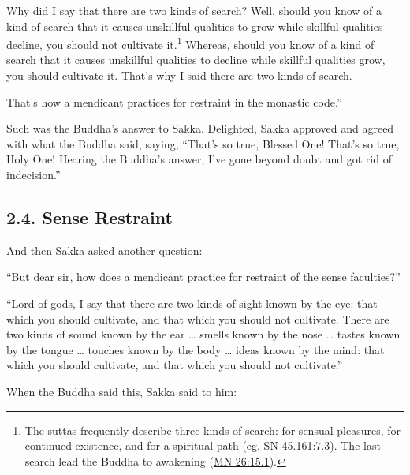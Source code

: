 \documentclass[12pt,openany]{book}%
\begin{document}
Why did I say that there are two kinds of search? Well, should you know of a kind of search that it causes unskillful qualities to grow while skillful qualities decline, you should not cultivate it.\footnote{The suttas frequently describe three kinds of search: for sensual pleasures, for continued existence, and for a spiritual path (eg. \href{https://suttacentral.net/sn45.161/en/sujato\#7.3}{SN 45.161:7.3}). The last search lead the Buddha to awakening (\href{https://suttacentral.net/mn26/en/sujato\#15.1}{MN 26:15.1}). } Whereas, should you know of a kind of search that it causes unskillful qualities to decline while skillful qualities grow, you should cultivate it. That’s why I said there are two kinds of search. 

That’s how a mendicant practices for restraint in the monastic code.” 

Such was the Buddha’s answer to Sakka. Delighted, Sakka approved and agreed with what the Buddha said, saying, “That’s so true, Blessed One! That’s so true, Holy One! Hearing the Buddha’s answer, I’ve gone beyond doubt and got rid of indecision.” 

\subsection*{2.4. Sense Restraint }

And then Sakka asked another question: 

“But dear sir, how does a mendicant practice for restraint of the sense faculties?” 

“Lord of gods, I say that there are two kinds of sight known by the eye: that which you should cultivate, and that which you should not cultivate. There are two kinds of sound known by the ear … smells known by the nose … tastes known by the tongue … touches known by the body … ideas known by the mind: that which you should cultivate, and that which you should not cultivate.” 

When the Buddha said this, Sakka said to him: 
\end{document}

